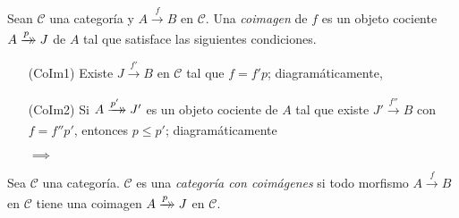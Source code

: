 \documentclass[tesis]{subfiles}
\begin{document}
\begin{Def}\label{Def: Coimagen}
    Sean $\mathscr{C}$ una categoría y $A\xrightarrow[]{f}B$ en $\mathscr{C}$. Una \emph{coimagen} de $f$ es un objeto cociente $A\xrightarrow[]{p}\mathrel{\mkern-14mu}\rightarrow J$ de $A$ tal que satisface las siguientes condiciones.

    \begin{itemize}
    
        \item[(CoIm1)] Existe $J\xrightarrow[]{f'}B$ en $\mathscr{C}$ tal que $f=f'p$; diagramáticamente,
            \begin{center}
            \end{center}

        \item[(CoIm2)] Si $A\xrightarrow[]{p'}\mathrel{\mkern-14mu}\rightarrow J'$ es un objeto cociente de $A$ tal que existe $J'\xrightarrow[]{f''}B$ con $f=f''p'$, entonces $p\le p'$; diagramáticamente
            \begin{center}
                \quad $\implies$ \quad
            \end{center}
    \end{itemize}
\end{Def}

\begin{Def}\label{Def: Categoría con imágenes}
    Sea $\mathscr{C}$ una categoría. $\mathscr{C}$ es una \emph{categoría con coimágenes} si todo morfismo $A\xrightarrow[]{f} B$ en $\mathscr{C}$ tiene una coimagen $A\xrightarrow[]{p}\mathrel{\mkern-14mu}\rightarrow J$ en $\mathscr{C}$.
\end{Def}
\end{document}
